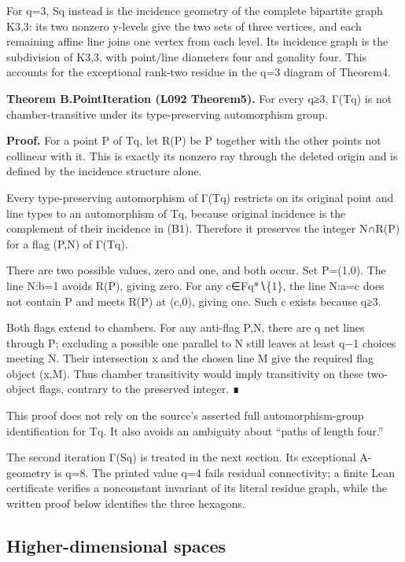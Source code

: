 For q=3, Sq instead is the incidence geometry of the complete bipartite
graph K3,3: its two nonzero y-levels give the two sets of three
vertices, and each remaining affine line joins one vertex from each
level. Its incidence graph is the subdivision of K3,3, with point/line
diameters four and gonality four. This accounts for the exceptional
rank-two residue in the q=3 diagram of Theorem4.

\textbf{Theorem B.PointIteration (L092 Theorem5).} For every q≥3, Γ(Tq)
is not chamber-transitive under its type-preserving automorphism group.

\textbf{Proof.} For a point P of Tq, let R(P) be P together with the
other points not collinear with it. This is exactly its nonzero ray
through the deleted origin and is defined by the incidence structure
alone.

Every type-preserving automorphism of Γ(Tq) restricts on its original
point and line types to an automorphism of Tq, because original
incidence is the complement of their incidence in (B1). Therefore it
preserves the integer \textbar N∩R(P)\textbar{} for a flag (P,N) of
Γ(Tq).

There are two possible values, zero and one, and both occur. Set
P=(1,0). The line N:b=1 avoids R(P), giving zero. For any c∈Fq*∖\{1\},
the line N:a=c does not contain P and meets R(P) at (c,0), giving one.
Such c exists because q≥3.

Both flags extend to chambers. For any anti-flag P,N, there are q net
lines through P; excluding a possible one parallel to N still leaves at
least q−1 choices meeting N. Their intersection x and the chosen line M
give the required flag object (x,M). Thus chamber transitivity would
imply transitivity on these two-object flags, contrary to the preserved
integer. ∎

This proof does not rely on the source's asserted full
automorphism-group identification for Tq. It also avoids an ambiguity
about ``paths of length four.''

The second iteration Γ(Sq) is treated in the next section. Its
exceptional A-geometry is q=8. The printed value q=4 fails residual
connectivity; a finite Lean certificate verifies a nonconstant invariant
of its literal residue graph, while the written proof below identifies
the three hexagons.

\subsection{Higher-dimensional spaces}\label{higher-dimensional-spaces}

